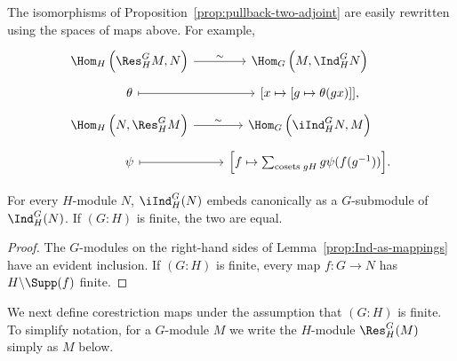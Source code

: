 The isomorphisms of Proposition~\ref{prop:pullback-two-adjoint} are easily
rewritten using the spaces of maps above. For example,
\begin{equation}\label{eqn:Ind-as-mappings}
	\begin{tikzcd}[row sep=tiny]
		\Hom_H\left(\Res^G_H M, N \right) \arrow[r, "\sim"] & \Hom_G\left(M, \Ind^G_H N \right) \\
		\theta \arrow[mapsto, r] & {\left[ x \mapsto [g \mapsto \theta(gx)] \right]}, \\
		\Hom_H\left(N, \Res^G_H M\right) \arrow[r, "\sim"] & \Hom_G\left(\iInd^G_H N, M\right) \\
		\psi \arrow[mapsto, r] & {\left[ f \mapsto \sum_{\text{cosets}\; gH} g \psi(f(g^{-1})) \right]}.
	\end{tikzcd}
\end{equation}

\begin{corollary}\label{prop:iInd-Ind}
	For every $H$-module $N$, $\iInd^G_H(N)$ embeds canonically as a
	$G$-submodule of $\Ind^G_H(N)$. If $(G:H)$ is finite, the two are equal.
\end{corollary}
\begin{proof}
	The $G$-modules on the right-hand sides of
	Lemma~\ref{prop:Ind-as-mappings} have an evident inclusion. If $(G:H)$ is
	finite, every map $f:G\to N$ has $H\backslash\Supp(f)$ finite.
\end{proof}

We next define corestriction maps under the assumption that $(G:H)$ is
finite. To simplify notation, for a $G$-module $M$ we write the $H$-module
$\Res^G_H(M)$ simply as $M$ below.

